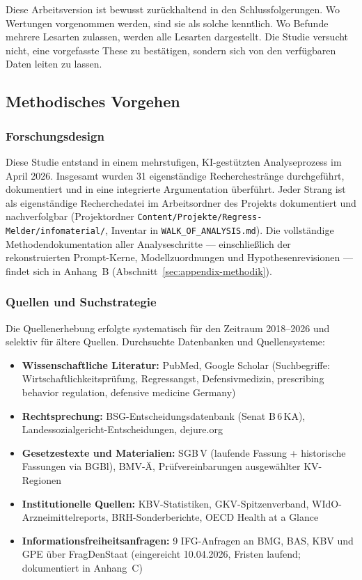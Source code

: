 \documentclass{umbruch-position}
\begin{document}
Diese Arbeitsversion ist bewusst zurückhaltend in den Schlussfolgerungen. Wo Wertungen vorgenommen werden, sind sie als solche kenntlich. Wo Befunde mehrere Lesarten zulassen, werden alle Lesarten dargestellt. Die Studie versucht nicht, eine vorgefasste These zu bestätigen, sondern sich von den verfügbaren Daten leiten zu lassen.

\subsection{Methodisches Vorgehen}

\subsubsection{Forschungsdesign}

Diese Studie entstand in einem mehrstufigen, KI-gestützten Analyseprozess im April 2026. Insgesamt wurden 31 eigenständige Recherchestränge durchgeführt, dokumentiert und in eine integrierte Argumentation überführt. Jeder Strang ist als eigenständige Recherchedatei im Arbeitsordner des Projekts dokumentiert und nachverfolgbar (Projektordner \texttt{Content/\allowbreak{}Projekte/\allowbreak{}Regress-Melder/\allowbreak{}infomaterial/}, Inventar in \texttt{WALK\_OF\_\allowbreak{}ANALYSIS.md}). Die vollständige Methodendokumentation aller Analyseschritte --- einschließlich der rekonstruierten Prompt-Kerne, Modellzuordnungen und Hypothesenrevisionen --- findet sich in Anhang~B (Abschnitt~\ref{sec:appendix-methodik}).

\subsubsection{Quellen und Suchstrategie}

Die Quellenerhebung erfolgte systematisch für den Zeitraum 2018--2026 und selektiv für ältere Quellen. Durchsuchte Datenbanken und Quellensysteme:

\begin{itemize}[nosep]
  \item \textbf{Wissenschaftliche Literatur:} PubMed, Google Scholar (Suchbegriffe: Wirtschaftlichkeitsprüfung, Regressangst, Defensivmedizin, prescribing behavior regulation, defensive medicine Germany)
  \item \textbf{Rechtsprechung:} BSG-Entscheidungsdatenbank (Senat B\,6\,KA), Landessozialgericht-Entscheidungen, dejure.org
  \item \textbf{Gesetzestexte und Materialien:} SGB\,V (laufende Fassung + historische Fassungen via BGBl), BMV-Ä, Prüfvereinbarungen ausgewählter KV-Regionen
  \item \textbf{Institutionelle Quellen:} KBV-Statistiken, GKV-Spitzenverband, WIdO-Arzneimittelreports, BRH-Sonderberichte, OECD Health at a Glance
  \item \textbf{Informationsfreiheitsanfragen:} 9 IFG-Anfragen an BMG, BAS, KBV und GPE über FragDenStaat (eingereicht 10.04.2026, Fristen laufend; dokumentiert in Anhang~C)
\end{itemize}
\end{document}
